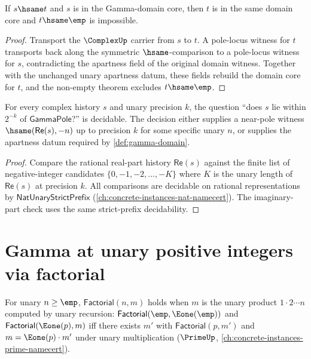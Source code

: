 \begin{theorem}
\label{thm:gamma-domain-core-hsame-transport-not-empty}
If \(s\hsame t\) and \(s\) is in the Gamma-domain core, then \(t\) is in the
same domain core and \(t\hsame\emp\) is impossible.
\end{theorem}
\begin{proof}
Transport the \(\ComplexUp\) carrier from \(s\) to \(t\). A pole-locus witness
for \(t\) transports back along the symmetric \(\hsame\)-comparison to a
pole-locus witness for \(s\), contradicting the apartness field of the original
domain witness. Together with the unchanged unary apartness datum, these fields
rebuild the domain core for \(t\), and the non-empty theorem excludes
\(t\hsame\emp\).
\end{proof}

\begin{lemma}
\label{lem:gamma-pole-apartness-decidable}
For every complex history \(s\) and unary precision \(k\), the question ``does \(s\) lie within \(2^{-k}\) of \(\mathsf{GammaPole}\)?'' is decidable. The decision either supplies a near-pole witness \(\hsame(\mathsf{Re}(s), -n)\) up to precision \(k\) for some specific unary \(n\), or supplies the apartness datum required by \autoref{def:gamma-domain}.
\end{lemma}
\begin{proof}
Compare the rational real-part history \(\mathsf{Re}(s)\) against the finite list of negative-integer candidates \(\{0, -1, -2, \ldots, -K\}\) where \(K\) is the unary length of \(\mathsf{Re}(s)\) at precision \(k\). All comparisons are decidable on rational representations by \(\mathsf{NatUnaryStrictPrefix}\) (\autoref{ch:concrete-instances-nat-namecert}). The imaginary-part check uses the same strict-prefix decidability.
\end{proof}

\section{Gamma at unary positive integers via factorial}
\label{sec:gamma-positive-integers}

\begin{definition}
\label{def:gamma-factorial}
For unary \(n \geq \emp\), \(\mathsf{Factorial}(n, m)\) holds when \(m\) is the unary product \(1 \cdot 2 \cdots n\) computed by unary recursion: \(\mathsf{Factorial}(\emp, \Eone(\emp))\) and \(\mathsf{Factorial}(\Eone(p), m)\) iff there exists \(m'\) with \(\mathsf{Factorial}(p, m')\) and \(m = \Eone(p) \cdot m'\) under unary multiplication (\(\PrimeUp\), \autoref{ch:concrete-instances-prime-namecert}).
\end{definition}

